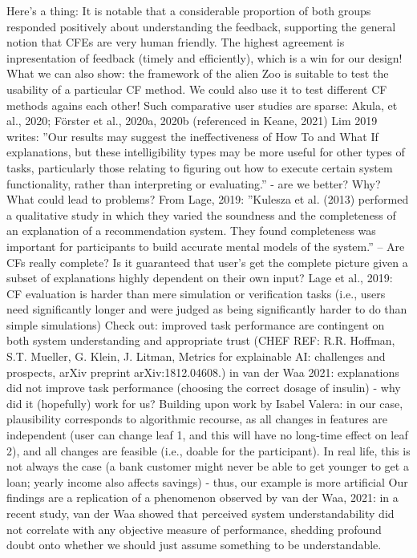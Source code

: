 \textcolor{ACMDarkBlue}{
Here's a thing:
It is notable that a considerable proportion of both groups responded positively about understanding the feedback, supporting the general notion that \glspl{CFE} are very human friendly.
The highest agreement is inpresentation of feedback (timely and efficiently), which is a win for our design!
} \textcolor{ACMDarkBlue}{
What we can also show: the framework of the alien Zoo is suitable to test the usability of a particular CF method. We could also use it to test different CF methods agains each other! Such comparative user studies are sparse: Akula, et al., 2020; Förster et al., 2020a, 2020b (referenced in Keane, 2021)
} \textcolor{ACMDarkBlue}{
Lim 2019 writes: ''Our results may suggest the ineffectiveness of How To and What If explanations, but these intelligibility types may be more useful for other types of tasks, particularly those relating to figuring out how to execute certain system functionality, rather than interpreting or evaluating.'' - are we better? Why?
} \textcolor{ACMDarkBlue}{
What could lead to problems? From Lage, 2019: ''Kulesza et al. (2013) performed a qualitative study in which they varied the soundness and the completeness of an explanation of a recommendation system. They found completeness was important for participants to build accurate mental models of the system.'' -- Are CFs really complete? Is it guaranteed that user's get the complete picture given a subset of explanations highly dependent on their own input?
} \textcolor{ACMDarkBlue}{
Lage et al., 2019: CF evaluation is harder than mere simulation or verification tasks (i.e., users need significantly longer and were judged as being significantly harder to do than simple simulations)
} \textcolor{ACMDarkBlue}{
Check out: improved task performance are contingent on both system understanding and appropriate trust (CHEF REF: R.R. Hoffman, S.T. Mueller, G. Klein, J. Litman, Metrics for explainable AI: challenges and prospects, arXiv preprint arXiv:1812.04608.)
} \textcolor{ACMDarkBlue}{
in van der Waa 2021: explanations did not improve task performance (choosing the correct dosage of insulin) - why did it (hopefully) work for us?
} \textcolor{ACMDarkBlue}{
Building upon work by Isabel Valera: in our case, plausibility corresponds to algorithmic recourse, as all changes in features are independent (user can change leaf 1, and this will have no long-time effect on leaf 2), and all changes are feasible (i.e., doable for the participant). In real life, this is not always the case (a bank customer might never be able to get younger to get a loan; yearly income also affects savings) - thus, our example is more artificial
} \textcolor{ACMDarkBlue}{
Our findings are a replication of a phenomenon observed by van der Waa, 2021: in a recent study, van der Waa showed that perceived system understandability did not correlate with any objective measure of performance, shedding profound doubt onto whether we should just assume something to be understandable.
}

